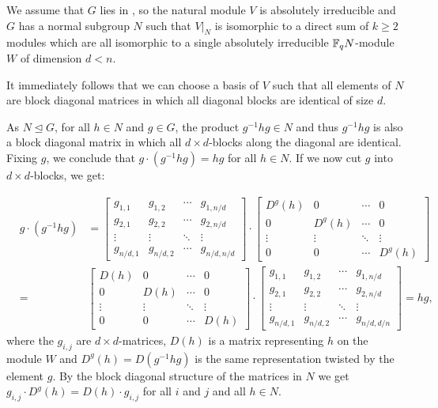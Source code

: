 We assume that $G$ lies in , so the natural module $V$ is
absolutely irreducible and $G$ has a normal subgroup $N$ such that
$V|_N$ is isomorphic to a direct sum of $k\ge 2$ modules which are all
isomorphic to a single absolutely irreducible $\mathbb{F}_q N$-module $W$
of dimension $d < n$.

It immediately follows that we can choose a basis of $V$ such that all
elements of $N$ are block diagonal matrices in which all diagonal blocks
are identical of size $d$.

As $N \unlhd G$, for all $h \in N$ and $g \in G$,
 the product $g^{-1}hg \in N$ and thus $g^{-1} h g$ is also 
a block diagonal matrix in which all $d \times d$-blocks along the diagonal
are identical. Fixing $g$, we conclude that $g\cdot (g^{-1}hg) = hg$ for all
$h \in N$. If we now cut $g$ into $d \times d$-blocks, we get:

\begin{eqnarray*}
   &g \cdot (g^{-1}hg) & 
 = \left[ \begin{array}{c|c|c|c}
      g_{1,1} & g_{1,2} & \cdots & g_{1,n/d} \\ \hline
      g_{2,1} & g_{2,2} & \cdots & g_{2,n/d} \\ \hline
      \vdots  & \vdots  & \ddots & \vdots    \\ \hline
      g_{n/d,1}&g_{n/d,2}& \cdots& g_{n/d,n/d} \end{array} \right]
\cdot \left[ \begin{array}{c|c|c|c}
      D^g(h) & 0   & \cdots &      0    \\ \hline
         0   &D^g(h)&\cdots &      0    \\ \hline
      \vdots  & \vdots  & \ddots & \vdots    \\ \hline
         0    &    0    & \cdots& D^g(h) \end{array} \right] \\
 &=& \left[ \begin{array}{c|c|c|c}
      D(h)    & 0       & \cdots &     0    \\ \hline
         0    &D(h)     &\cdots &      0    \\ \hline
      \vdots  & \vdots  & \ddots & \vdots    \\ \hline
         0    &    0    & \cdots& D(h)   \end{array} \right]
\cdot \left[ \begin{array}{c|c|c|c}
      g_{1,1} & g_{1,2} & \cdots & g_{1,n/d} \\ \hline
      g_{2,1} & g_{2,2} & \cdots & g_{2,n/d} \\ \hline
      \vdots  & \vdots  & \ddots & \vdots    \\ \hline
      g_{n/d,1}&g_{n/d,2}& \cdots& g_{n/d,d/n} \end{array} \right]
 = hg,
\end{eqnarray*}
where the $g_{i,j}$ are $d \times d$-matrices, $D(h)$ is a matrix
representing $h$ on the module $W$ and $D^g(h) = D(g^{-1}hg)$ is the
same representation twisted by the element $g$. By the block diagonal
structure of the matrices in $N$ we get 
$g_{i,j} \cdot D^g(h) = D(h) \cdot g_{i,j}$ for all $i$ and $j$ and 
all $h \in N$.

